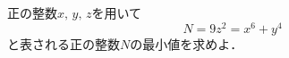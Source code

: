 \documentclass[../../main.tex]{subfiles}
\begin{document}
正の整数$x, \, y, \, z$を用いて
\[ N=9z^2=x^6+y^4 \]
と表される正の整数$N$の最小値を求めよ．
\end{document}
